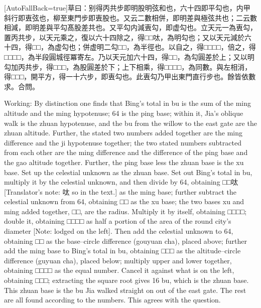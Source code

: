 \documentclass[11pt]{article}
\newcommand{\zhsmall}{\footnotesize\color{black!70}}
\newcommand{\unitlabel}[1]{\marginpar{\raggedleft\tiny\color{gray}#1}}
\newenvironment{unitzh}{\par\CJKfontspec{Noto Serif CJK SC}[AutoFallBack=true]\large\linespread{1.25}\selectfont}{\par}
\newenvironment{uniten}{\par\small\color{black!85}}{\par\medskip}
\begin{document}
\begin{unitzh}\unitlabel{ceyuan-023.20}草曰：别得丙共步即明股明弦和也，六十四即平勾也，内甲斜行即叀弦也，柳至東門步即叀股也。又云二數相併，即明差與極弦共也；二云數相減，即明差與平勾髙股差共也。又平勾内減叀勾，即虚勾也。立天元一為叀勾，置丙共步，以天元乘之，復以六十四除之，得□□呔，為明勾也；又以天元減於六十四，得□□，為虚勾也；併虚明二勾□□，為半徑也。以自之，得□□□□，倍之，得□□□□，為半段圓城徑冪{\zhsmall 寄左}。乃以天元加六十四，得□□，為勾圓差於上；又以明勾加丙共步，得□□□，為股圓差於下；上下相乘，得□□□□，為同數。與左相消，得□□□，開平方，得一十六步，即叀勾也。此叀勾乃甲出東門直行步也。餘皆依數求。合問。\end{unitzh}
\begin{uniten}Working: By distinction one finds that Bing's total in bu is the sum of the ming altitude and the ming hypotenuse; 64 is the ping base; within it, Jia's oblique walk is the zhuan hypotenuse, and the bu from the willow to the east gate are the zhuan altitude. Further, the stated two numbers added together are the ming difference and the ji hypotenuse together; the two stated numbers subtracted from each other are the ming difference and the difference of the ping base and the gao altitude together. Further, the ping base less the zhuan base is the xu base. Set up the celestial unknown as the zhuan base. Set out Bing's total in bu, multiply it by the celestial unknown, and then divide by 64, obtaining □□呔 [Translator's note: 呔 so in the text.] as the ming base; further subtract the celestial unknown from 64, obtaining □□ as the xu base; the two bases xu and ming added together, □□, are the radius. Multiply it by itself, obtaining □□□□; double it, obtaining □□□□ as half a portion of the area of the round city's diameter [Note: lodged on the left]. Then add the celestial unknown to 64, obtaining □□ as the base–circle difference (gouyuan cha), placed above; further add the ming base to Bing's total in bu, obtaining □□□ as the altitude–circle difference (guyuan cha), placed below; multiply upper and lower together, obtaining □□□□ as the equal number. Cancel it against what is on the left, obtaining □□□; extracting the square root gives 16 bu, which is the zhuan base. This zhuan base is the bu Jia walked straight on out of the east gate. The rest are all found according to the numbers. This agrees with the question.\end{uniten}
\end{document}
